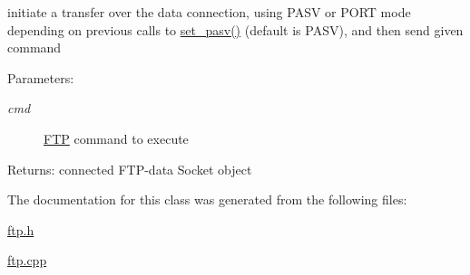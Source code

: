 initiate a transfer over the data connection, using PASV or PORT mode depending on previous calls to \hyperlink{classftplib_1_1FTP_e35230239f093f01fb295ccb007de1b2}{set\_\-pasv()} (default is PASV), and then send given command 

\begin{Desc}
\item[Parameters:]
\begin{description}
\item[{\em cmd}]\hyperlink{classftplib_1_1FTP}{FTP} command to execute \end{description}
\end{Desc}
\begin{Desc}
\item[Returns:]connected FTP-data Socket object \end{Desc}


The documentation for this class was generated from the following files:\begin{CompactItemize}
\item 
\hyperlink{ftp_8h}{ftp.h}\item 
\hyperlink{ftp_8cpp}{ftp.cpp}\end{CompactItemize}
